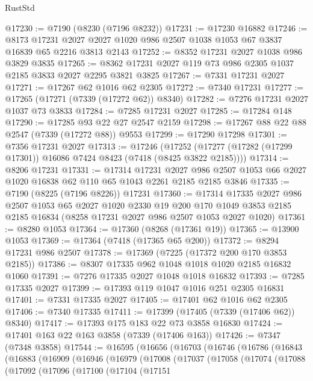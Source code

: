 \begin{lexlean}{RustStd}
\begin{coremodule}
@17230 := @7190 (@8230 (@7196 @8232))
@17231 := @17230 @16882
@17246 := @8173
    @17231
    @2027
    @2027
    @1020
    @986
    @2507
    @1038
    @1053
    @67
    @3837
    @16839
    @65
    @2216
    @3813
    @2143
@17252 := @8352 @17231 @2027 @1038 @986 @3829 @3835
@17265 := @8362 @17231 @2027 @119 @73 @986 @2305 @1037 @2185 @3833 @2027 @2295 @3821 @3825
@17267 := @7331 @17231 @2027
@17271 := @17267 @62 @1016 @62 @2305
@17272 := @7340 @17231
@17277 := @17265 (@17271 (@7339 (@17272 @62)) @8340)
@17282 := @7276 @17231 @2027 @1037 @73 @3833
@17284 := @7285 @17231 @2027
@17285 := @17284 @148
@17290 := @17285 @93 @22 @27 @2547 @2159
@17298 := @17267 @88 @22 @88 @2547 (@7339 (@17272 @88)) @9553
@17299 := @17290 @17298
@17301 := @7356 @17231 @2027
@17313 := @17246
    (@17252 (@17277 (@17282 (@17299 @17301)) @16086 @7424 @8423 (@7418 (@8425 @3822 @2185))))
@17314 := @8206 @17231
@17331 := @17314
    @17231
    @2027
    @986
    @2507
    @1053
    @66
    @2027
    @1020
    @16838
    @62
    @110
    @65
    @1043
    @2261
    @2185
    @2185
    @3846
@17335 := @7190 (@8225 (@7196 @8226)) @17231
@17360 := @17314
    @17335
    @2027
    @986
    @2507
    @1053
    @65
    @2027
    @1020
    @2330
    @19
    @200
    @170
    @1049
    @3853
    @2185
    @2185
    @16834
    (@8258 @17231 @2027 @986 @2507 @1053 @2027 @1020)
@17361 := @8280 @1053
@17364 := @17360 (@8268 (@17361 @19))
@17365 := @13900 @1053
@17369 := @17364 (@7418 (@17365 @65 @200))
@17372 := @8294 @17231 @986 @2507
@17378 := @17369 (@7225 (@17372 @200 @170 @3853 @2185))
@17386 := @8307 @17335 @962 @1048 @1018 @1020 @2185 @16832 @1060
@17391 := @7276 @17335 @2027 @1048 @1018 @16832
@17393 := @7285 @17335 @2027
@17399 := @17393 @119 @1047 @1016 @251 @2305 @16831
@17401 := @7331 @17335 @2027
@17405 := @17401 @62 @1016 @62 @2305
@17406 := @7340 @17335
@17411 := @17399 (@17405 (@7339 (@17406 @62)) @8340)
@17417 := @17393 @175 @183 @22 @73 @3858 @16830
@17424 := @17401 @163 @22 @163 @3858 (@7339 (@17406 @163))
@17426 := @7347 (@7348 @3858)
@17544 := @16595
    (@16656
      (@16703
        (@16746
          (@16786
            (@16843
              (@16883
                (@16909
                  (@16946
                    (@16979
                      (@17008
                        (@17037
                          (@17058
                            (@17074
                              (@17088
                                (@17092
                                  (@17096
                                    (@17100
                                      (@17104
                                        (@17151

\end{coremodule}
\end{lexlean}
